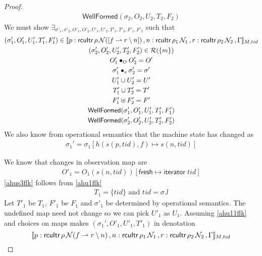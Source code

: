 \begin{proof}
\begin{gather}
\textsf{WellFormed}(\sigma_2,O_{2},U_{2},T_{2},F_2)
\end{gather}
We must show $\exists_{\sigma'_1, \sigma'_2, O'_{1}, O'_{2}, U'_{1}, U'_{2}, T'_{1}, T'_{2}, F'_1, F'_2}$ such that
\begin{gather}\label{phu5flk}
\begin{aligned}
(\sigma_1',O'_{1},U'_{1}, T'_{1},F'_1)  \in \llbracket p:\textsf{rcuItr}\, \rho \, \mathcal{N}([f\rightharpoonup r \setminus n]) \, , n:\textsf{rcuItr}\, \rho_1 \, \mathcal{N}_1 \, , r:\textsf{rcuItr}\, \rho_2\, \mathcal{N}_2\, ,  \Gamma \rrbracket_{M,tid}
\end{aligned}
\\
\label{phu6flk}
(\sigma_2',O'_{2},U'_{2}, T'_{2}, F'_2) \in \mathcal{R}(\{m\})
\\
\label{phu7flk}
O'_{1} \bullet_{O} O'_{2} = O'
\\
\label{ahusigf'lk}
\sigma'_1 \bullet_s \sigma'_2 = \sigma' \\
\label{phu8flk}
U'_{1} \cup U'_{2} = U'
\\
\label{phu9flk}
T'_{1} \cup T'_{2} = T'
\\
\label{phuffflk}
F'_1 \uplus F'_2 = F'
\\
\label{phu10flk}
\textsf{WellFormed}(\sigma_1',O'_{1},U'_{1},T'_{1},F'_1) \\
\label{phu11flk}
\textsf{WellFormed}(\sigma_2',O'_{2},U'_{2},T'_{2},F'_2)
\end{gather}
We also know from operational semantics that the machine state has changed as
\begin{gather}\label{ahusflk}
\sigma_1' =  \sigma_1[h(s(p,tid),f ) \mapsto s(n,tid) ]
\end{gather}

We know that changes in observation map are
\begin{gather}\label{ahus1flk}
O'_1 =  O_1(s(n,tid))[\textsf{fresh} \mapsto \textsf{iterator}\;tid ]
\end{gather}
\ref{ahus3flk} follows from \ref{ahu1flk}
\begin{gather}\label{ahus3flk}
  T_1 = \{tid\} \text{ and } tid = \sigma.l
\end{gather}
Let $T'_1$ be $T_1$, $F'_1$ be $F_1$ and $\sigma'_1$ be determined by operational semantics. The undefined map need not change so we can pick $U'_1$ as $U_1$. Assuming \ref{ahu11flk} and choices on maps makes $(\sigma_1',O'_{1},U'_{1}, T'_{1})$ in denotation
\[\llbracket p:\textsf{rcuItr}\, \rho \, \mathcal{N}(f \rightharpoonup r \setminus n) \, , n:\textsf{rcuItr}\, \rho_1 \, \mathcal{N}_1 \, , r:\textsf{rcuItr}\,\rho_2\,\mathcal{N}_2\, ,  \Gamma \rrbracket_{M,tid}\]


\end{proof}
